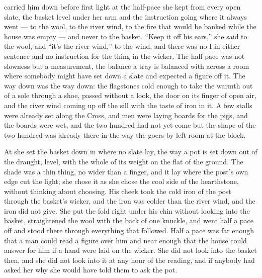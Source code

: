  carried him down before first light at the half-pace she kept from every open slate, the basket level under her arm and the instruction going where it always went --- to the wool, to the river wind, to the fire that would be banked while the house was empty --- and never to the basket. “Keep it off his ears,” she said to the wool, and “it’s the river wind,” to the wind, and there was no I in either sentence and no instruction for the thing in the wicker. The half-pace was not slowness but a measurement, the balance a tray is balanced with across a room where somebody might have set down a slate and expected a figure off it. The way down was the way down: the flagstones cold enough to take the warmth out of a sole through a shoe,  passed without a look, the door on its finger of open air, and the river wind coming up off the sill with the taste of iron in it. A few stalls were already set along the Cross, and men were laying boards for the pigs, and the boards were wet, and the two hundred had not yet come but the shape of the two hundred was already there in the way the goers-by left room at the block.

At  she set the basket down in  where no slate lay, the way a pot is set down out of the draught, level, with the whole of its weight on the flat of the ground. The shade was a thin thing, no wider than a finger, and it lay where the post's own edge cut the light; she chose it as she chose the cool side of the hearthstone, without thinking about choosing. His cheek took the cold iron of the post through the basket's wicker, and the iron was colder than the river wind, and the iron did not give. She put the fold right under his chin without looking into the basket, straightened the wool with the back of one knuckle, and went half a pace off and stood there through everything that followed. Half a pace was far enough that a man could read a figure over him and near enough that the house could answer for him if a hand were laid on the wicker. She did not look into the basket then, and she did not look into it at any hour of the reading, and if anybody had asked her why she would have told them to ask the pot.

